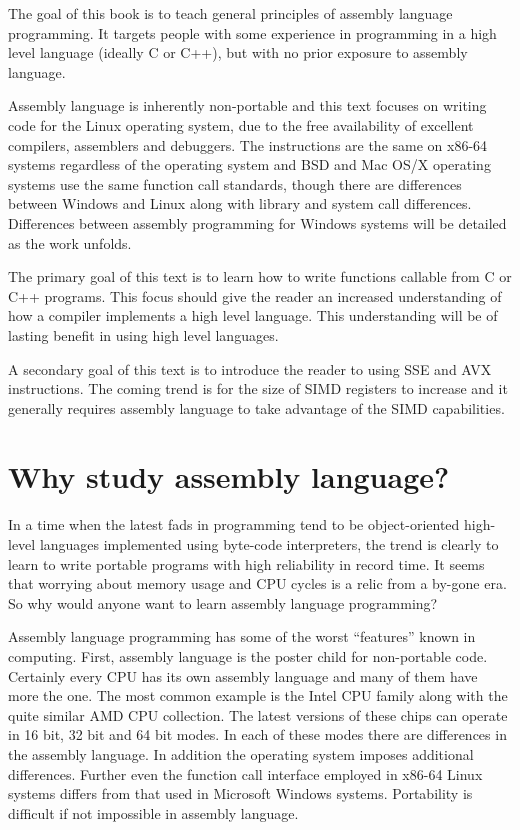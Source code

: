 \documentclass[11pt,b5paper]{book}
\begin{document}
The goal of this book is to teach general principles of assembly language
programming.
It targets people with some experience in programming in a high level
language (ideally C or C++), but with
no prior exposure to assembly language.

Assembly language is inherently non-portable and this text focuses on writing code
for the Linux operating system, due to the free availability of excellent
compilers, assemblers and debuggers.
The instructions are the same on x86-64 systems regardless of the
operating system
and BSD and Mac OS/X operating systems use the same function call standards, though
there are differences between Windows and Linux along with library and system call differences.
Differences between assembly programming for Windows systems will be detailed
as the work unfolds.

The primary goal of this text is to learn how to write functions callable from C or
C++ programs.
This focus should give the reader an increased understanding of how a compiler
implements a high level language.
This understanding will be of lasting benefit in using high level languages.

A secondary goal of this text is to introduce the reader to using SSE and AVX
instructions.
The coming trend is for the size of SIMD registers to increase and it generally
requires assembly language to take advantage of the SIMD capabilities.

\section{Why study assembly language?}

In a time when the latest fads in programming tend to be object-oriented
high-level languages implemented using byte-code interpreters, the trend is
clearly to learn to write portable programs with high reliability in record
time.
It seems that worrying about memory usage and CPU cycles is a relic from a
by-gone era.
So why would anyone want to learn assembly language programming?

Assembly language programming has some of the worst ``features'' known in
computing.
First, assembly language is the poster child for non-portable code.
Certainly every CPU has its own assembly language and many of them have more
the one.
The most common example is the Intel CPU family along with the quite similar
AMD CPU collection.
The latest versions of these chips can operate in 16 bit, 32 bit and 64 bit
modes.
In each of these modes there are differences in the assembly language.
In addition the operating system imposes additional differences.
Further even the function call interface employed in x86-64 Linux systems 
differs from that used in Microsoft Windows systems.
Portability is difficult if not impossible in assembly language.
\end{document}
